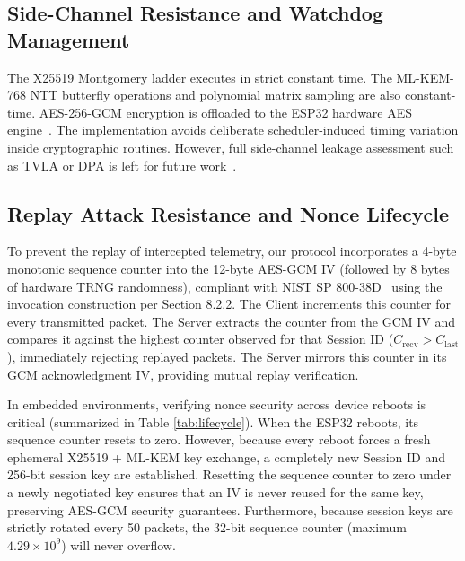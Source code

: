 \documentclass[journal, 10pt]{IEEEtran}
\begin{document}
\subsection{Side-Channel Resistance and Watchdog Management}
The X25519 Montgomery ladder executes in strict constant time. The ML-KEM-768 NTT butterfly operations and polynomial matrix sampling are also constant-time. AES-256-GCM encryption is offloaded to the ESP32 hardware AES engine~\cite{b30}. The implementation avoids deliberate scheduler-induced timing variation inside cryptographic routines. However, full side-channel leakage assessment such as TVLA or DPA is left for future work~\cite{b18,b40}.

\subsection{Replay Attack Resistance and Nonce Lifecycle}
To prevent the replay of intercepted telemetry, our protocol incorporates a 4-byte monotonic sequence counter into the 12-byte AES-GCM IV (followed by 8 bytes of hardware TRNG randomness), compliant with NIST SP 800-38D~\cite{b22} using the invocation construction per Section 8.2.2. The Client increments this counter for every transmitted packet. The Server extracts the counter from the GCM IV and compares it against the highest counter observed for that Session ID ($C_{\text{recv}} > C_{\text{last}}$), immediately rejecting replayed packets. The Server mirrors this counter in its GCM acknowledgment IV, providing mutual replay verification.

In embedded environments, verifying nonce security across device reboots is critical (summarized in Table \ref{tab:lifecycle}). When the ESP32 reboots, its sequence counter resets to zero. However, because every reboot forces a fresh ephemeral X25519 + ML-KEM key exchange, a completely new Session ID and 256-bit session key are established. Resetting the sequence counter to zero under a newly negotiated key ensures that an IV is never reused for the same key, preserving AES-GCM security guarantees. Furthermore, because session keys are strictly rotated every 50 packets, the 32-bit sequence counter (maximum $4.29 \times 10^9$) will never overflow.
\end{document}
